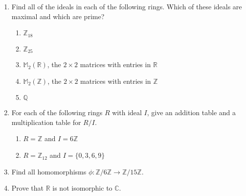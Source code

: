 {\begin{enumerate}
\begin{enumerate}
 \item
${\mathbb Z}_{10}$
 
 \item
${\mathbb Z}_{12}$
 
 \item
${\mathbb Z}_{7}$
 
 \item
${\mathbb M}_2( {\mathbb Z} )$, the $2 \times 2$ matrices with entries in
${\mathbb Z}$ 
 
 \item
${\mathbb M}_2( {\mathbb Z}_2 )$, the $2 \times 2$ matrices with entries in
${\mathbb Z}_2$  
\end{enumerate}
 
 
\item
Find all of the ideals in each of the following rings.  Which of these
ideals are maximal and which are prime?
\begin{enumerate}
 
 \item
${\mathbb Z}_{18}$
 
 \item
${\mathbb Z}_{25}$
 
 \item
${\mathbb M}_2( {\mathbb R} )$, the $2 \times 2$ matrices with entries in
${\mathbb R}$ 
 
 \item
${\mathbb M}_2( {\mathbb Z} )$, the $2 \times 2$ matrices with entries in
${\mathbb Z}$ 
 
 \item
${\mathbb Q}$
 
\end{enumerate}
 
 
\item
For each of the following rings $R$ with ideal $I$, give an addition
table and a multiplication table for $R/I$. 
\begin{enumerate}
 
 \item
$R = {\mathbb Z}$ and $I = 6 {\mathbb Z}$
 
 \item
$R = {\mathbb Z}_{12}$ and $I = \{ 0, 3, 6, 9 \}$
 
\end{enumerate}
 
 
\item
Find all homomorphisms $\phi : {\mathbb Z} / 6 {\mathbb Z} \rightarrow {\mathbb
Z} / 15 {\mathbb Z}$. 
 
 
\item
Prove that ${\mathbb R}$ is not isomorphic to ${\mathbb C}$.
 

\end{enumerate}}
